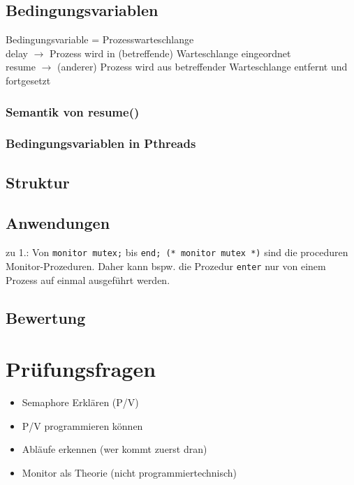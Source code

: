 \subsection{Bedingungsvariablen}
Bedingungsvariable = Prozesswarteschlange\\
delay $\to$ Prozess wird in (betreffende) Warteschlange eingeordnet\\
resume $\to$ (anderer) Prozess wird aus betreffender Warteschlange entfernt und fortgesetzt
\subsubsection{Semantik von resume()}
\subsubsection{Bedingungsvariablen in Pthreads}
\subsection{Struktur}
\subsection{Anwendungen}
zu 1.:
%
Von \lstinline$monitor mutex;$ bis \lstinline$end; (* monitor mutex *)$ sind die proceduren Monitor-Prozeduren. Daher kann bspw. die Prozedur \lstinline$enter$ nur von einem Prozess auf einmal ausgeführt werden.

\subsection{Bewertung}

\section{Prüfungsfragen}
\begin{itemize}
\item Semaphore Erklären (P/V)
\item P/V programmieren können
\item Abläufe erkennen (wer kommt zuerst dran)
\item Monitor als Theorie (nicht programmiertechnisch)
\end{itemize}